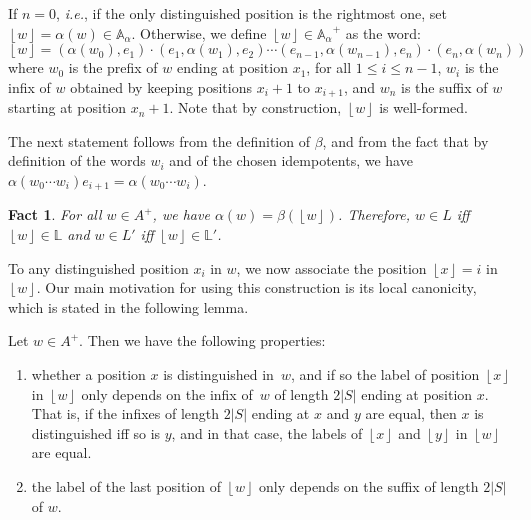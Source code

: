 \documentclass[a4paper,USenglish]{lipics}
\newcommand\Abb{\ensuremath{\mathbb{A}}\xspace}
\newcommand\Lbb{\ensuremath{\mathbb{L}}\xspace}
\newcommand{\croch}[1]{\ensuremath{\left\lfloor #1 \right\rfloor}\xspace}
\newcommand\wfA{\ensuremath{\Abb_\alpha}\xspace}
\theoremstyle{plain}
\newtheorem{fact}[theorem]{Fact}
\begin{document}
If $n=0$, \emph{i.e.}, if the only distinguished position is the rightmost one,
set $\croch{w} = \alpha(w) \in \wfA$. Otherwise, we define $\croch{w} \in
\wfA^+$ as the word:
\begin{equation}
  \label{eq:croch}
  \croch{w} = (\alpha(w_0),e_1)\cdot (e_1,\alpha(w_1),e_2) \cdots
  (e_{n-1},\alpha(w_{n-1}),e_n)\cdot (e_{n},\alpha(w_{n}))
\end{equation}
\noindent where $w_0$ is the prefix of $w$ ending at position $x_1$, for all $1 \leqslant i
\leqslant n-1$, $w_i$ is the infix of $w$ obtained by keeping positions $x_{i}+1$
to $x_{i+1}$, and $w_{n}$ is the suffix of $w$ starting at position
$x_n+1$. Note that by construction, $\croch{w}$ is well-formed.

The next statement follows from the definition of $\beta$, and from the fact
that by definition of the words $w_i$ and of the chosen idempotents, we have
$\alpha(w_0\cdots w_{i})e_{i+1}=\alpha(w_0\cdots w_{i})$.

\begin{fact} \label{fct:sametype}
  For all $w \in A^+$, we have $\alpha(w) = \beta(\croch{w})$. Therefore, $w \in L$
  iff $\croch{w}\in\Lbb$ and $w\in L'$ iff $\croch{w}\in \Lbb'$.
\end{fact}

To any distinguished position $x_i$ in $w$, we now
associate the position $\croch{x} = i$ in $\croch{w}$. Our main
motivation for using this construction is its local canonicity, which is stated
in the following lemma.

\begin{lemma} \label{lem:canonic}
  Let $w \in A^+$. Then we have the following
  properties:
  \begin{enumerate}[label=$(\alph*)$,ref=$(\alph*)$]
  \item\label{item:5} whether a position $x$ is distinguished in~$w$, and if so the label of position $\croch{x}$
    in $\croch{w}$ only depends on the infix of~$w$ of length $2|S|$
    ending at position $x$. That is, if the infixes of length $2|S|$ ending at
    $x$ and $y$ are equal, then $x$ is distinguished iff so is $y$, and in that case,
    the labels of $\croch{x}$ and $\croch{y}$ in $\croch{w}$ are equal.
  \item the label of the last position of \croch{w} only depends on
    the suffix of length $2|S|$ of $w$.
  \end{enumerate}
\end{lemma}
\end{document}
